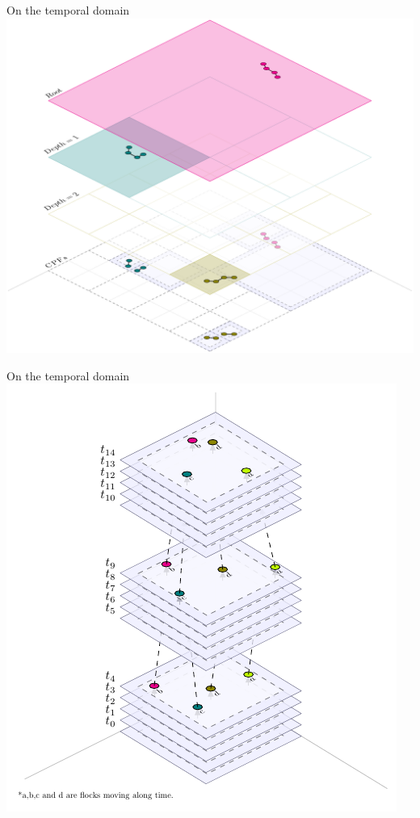 \begin{frame}{On the temporal domain}
    \centering
    \includegraphics[height=0.8\textheight]{../thesis/chapterPFlocks/figures/plots/11_temporal_partitions/LCA}
\end{frame}

\begin{frame}{On the temporal domain}
    \centering
    \includegraphics[height=0.9\textheight]{../thesis/chapterPFlocks/figures/plots/11_temporal_partitions/Cube-based}
\end{frame}


